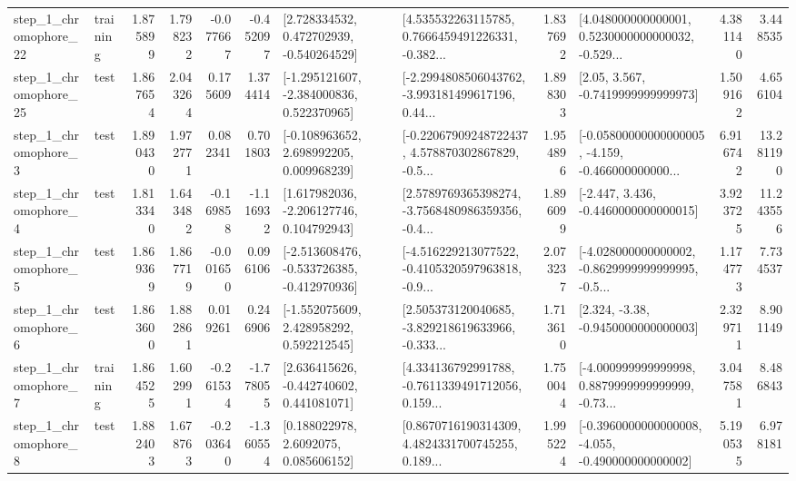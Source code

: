 \begin{tabular}{llrrrrllrlrr}
    step\_1\_chromophore\_22 &  training &      1.875899 &    1.798232 &     -0.077667 & -0.452097 &    [2.728334532, 0.472702939, -0.540264529] &  [4.535532263115785, 0.7666459491226331, -0.382... &       1.837692 &  [4.048000000000001, 0.5230000000000032, -0.529... &            4.381140 &          3.448535 \\
    step\_1\_chromophore\_25 &      test &      1.867654 &    2.043264 &      0.175609 &  1.374414 &   [-1.295121607, -2.384000836, 0.522370965] &  [-2.2994808506043762, -3.993181499617196, 0.44... &       1.898303 &                 [2.05, 3.567, -0.7419999999999973] &            1.509162 &          4.656104 \\
     step\_1\_chromophore\_3 &      test &      1.890430 &    1.972771 &      0.082341 &  0.701803 &    [-0.108963652, 2.698992205, 0.009968239] &  [-0.22067909248722437, 4.578870302867829, -0.5... &       1.954896 &  [-0.05800000000000005, -4.159, -0.466000000000... &            6.916742 &         13.281190 \\
     step\_1\_chromophore\_4 &      test &      1.813340 &    1.643482 &     -0.169858 & -1.116932 &    [1.617982036, -2.206127746, 0.104792943] &  [2.5789769365398274, -3.7568480986359356, -0.4... &       1.896099 &               [-2.447, 3.436, -0.4460000000000015] &            3.923725 &         11.243556 \\
     step\_1\_chromophore\_5 &      test &      1.869369 &    1.867719 &     -0.001650 &  0.096106 &  [-2.513608476, -0.533726385, -0.412970936] &  [-4.516229213077522, -0.4105320597963818, -0.9... &       2.073237 &  [-4.028000000000002, -0.8629999999999995, -0.5... &            1.174773 &          7.734537 \\
     step\_1\_chromophore\_6 &      test &      1.863600 &    1.882861 &      0.019261 &  0.246906 &    [-1.552075609, 2.428958292, 0.592212545] &  [2.505373120040685, -3.829218619633966, -0.333... &       1.713610 &                [2.324, -3.38, -0.9450000000000003] &            2.329711 &          8.901149 \\
     step\_1\_chromophore\_7 &  training &      1.864525 &    1.602991 &     -0.261534 & -1.778055 &    [2.636415626, -0.442740602, 0.441081071] &  [4.334136792991788, -0.7611339491712056, 0.159... &       1.750044 &  [-4.000999999999998, 0.8879999999999999, -0.73... &            3.047581 &          8.486843 \\
     step\_1\_chromophore\_8 &      test &      1.882403 &    1.678763 &     -0.203640 & -1.360554 &       [0.188022978, 2.6092075, 0.085606152] &  [0.8670716190314309, 4.4824331700745255, 0.189... &       1.995224 &  [-0.3960000000000008, -4.055, -0.490000000000002] &            5.190535 &          6.978181 \\

\end{tabular}
